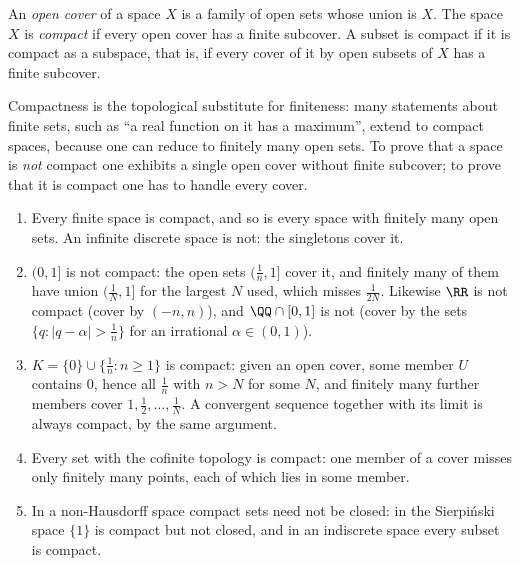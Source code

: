 \begin{definition}\label{general-topology:definition-compact}
An \emph{open cover} of a space $X$ is a family of open sets whose union is $X$. The space $X$ is \emph{compact} if every open cover has a finite
subcover. A subset is compact if it is compact as a subspace, that is, if every cover of it by open subsets of $X$ has a finite subcover.
\end{definition}

Compactness is the topological substitute for finiteness: many statements about finite sets, such as ``a real function on it has a maximum'', extend to compact spaces, because one can reduce to
finitely many open sets. To prove that a space is \emph{not} compact one exhibits a single open cover without finite subcover; to prove that it is compact one has to handle every cover.

\begin{example}\label{general-topology:example-compactness}
\begin{enumerate}
\item Every finite space is compact, and so is every space with finitely many open sets. An infinite discrete space is not: the singletons cover it.
\item $(0, 1]$ is not compact: the open sets $(\frac1n, 1]$ cover it, and finitely many of them have union $(\frac1N, 1]$ for the largest $N$ used, which misses $\frac1{2N}$. Likewise $\RR$ is not compact
(cover by $(-n, n)$), and $\QQ \cap [0, 1]$ is not (cover by the sets $\{q : |q - \alpha| > \frac1n\}$ for an irrational $\alpha \in (0, 1)$).
\item $K = \{0\} \cup \{\frac1n : n \geq 1\}$ is compact: given an open cover, some member $U$ contains $0$, hence all $\frac1n$ with $n > N$ for some $N$, and finitely many further members cover
$1, \frac12, \ldots, \frac1N$. A convergent sequence together with its limit is always compact, by the same argument.
\item Every set with the cofinite topology is compact: one member of a cover misses only finitely many points, each of which lies in some member.
\item In a non-Hausdorff space compact sets need not be closed: in the Sierpi\'nski space $\{1\}$ is compact but not closed, and in an indiscrete space every subset is compact.
\end{enumerate}
\end{example}

